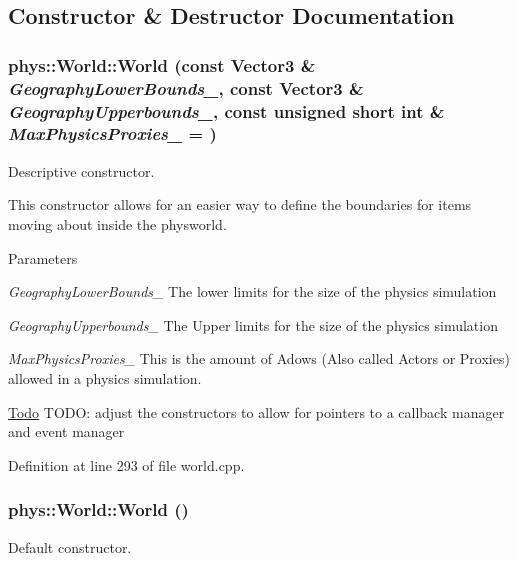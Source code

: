 \subsection{Constructor \& Destructor Documentation}
\hypertarget{classphys_1_1World_aa74e4e6053044c3ecec87fdbf7880c18}{
\subsubsection[{World}]{\setlength{\rightskip}{0pt plus 5cm}phys::World::World (const {\bf Vector3} \& {\em GeographyLowerBounds\_\-}, \/  const {\bf Vector3} \& {\em GeographyUpperbounds\_\-}, \/  const unsigned short int \& {\em MaxPhysicsProxies\_\-} = {})}}
\label{da/ddf/classphys_1_1World_aa74e4e6053044c3ecec87fdbf7880c18}


Descriptive constructor. 

This constructor allows for an easier way to define the boundaries for items moving about inside the physworld. 
\begin{DoxyParams}{Parameters}
\item[{\em GeographyLowerBounds\_\-}]The lower limits for the size of the physics simulation \item[{\em GeographyUpperbounds\_\-}]The Upper limits for the size of the physics simulation \item[{\em MaxPhysicsProxies\_\-}]This is the amount of Adows (Also called Actors or Proxies) allowed in a physics simulation.\end{DoxyParams}
\begin{Desc}
\item[\hyperlink{todo__todo000016}{Todo}]TODO: adjust the constructors to allow for pointers to a callback manager and event manager \end{Desc}


Definition at line 293 of file world.cpp.

\hypertarget{classphys_1_1World_a7f762724406c874250c3dc8910a1e695}{
\subsubsection[{World}]{\setlength{\rightskip}{0pt plus 5cm}phys::World::World ()}}
\label{da/ddf/classphys_1_1World_a7f762724406c874250c3dc8910a1e695}


Default constructor. 

